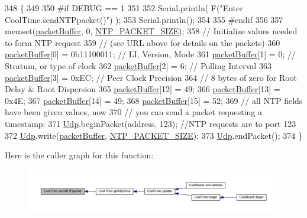 \begin{DoxyCode}
348 \{
349 
350 \textcolor{preprocessor}{#if DEBUG == 1 }
351 
352     Serial.println( F(\textcolor{stringliteral}{"Enter CoolTime.sendNTPpacket()"}) );
353     Serial.println();
354 
355 \textcolor{preprocessor}{#endif}
356 
357     memset(\hyperlink{class_cool_time_a27e6abc82a5c2f72161956967005bec7}{packetBuffer}, 0, \hyperlink{_cool_time_8h_a56a6ea64006651b4f42adf713e244f06}{NTP\_PACKET\_SIZE});
358     \textcolor{comment}{// Initialize values needed to form NTP request}
359     \textcolor{comment}{// (see URL above for details on the packets)}
360     \hyperlink{class_cool_time_a27e6abc82a5c2f72161956967005bec7}{packetBuffer}[0] = 0b11100011;   \textcolor{comment}{// LI, Version, Mode}
361     \hyperlink{class_cool_time_a27e6abc82a5c2f72161956967005bec7}{packetBuffer}[1] = 0;     \textcolor{comment}{// Stratum, or type of clock}
362     \hyperlink{class_cool_time_a27e6abc82a5c2f72161956967005bec7}{packetBuffer}[2] = 6;     \textcolor{comment}{// Polling Interval}
363     \hyperlink{class_cool_time_a27e6abc82a5c2f72161956967005bec7}{packetBuffer}[3] = 0xEC;  \textcolor{comment}{// Peer Clock Precision}
364     \textcolor{comment}{// 8 bytes of zero for Root Delay & Root Dispersion}
365     \hyperlink{class_cool_time_a27e6abc82a5c2f72161956967005bec7}{packetBuffer}[12]  = 49;
366     \hyperlink{class_cool_time_a27e6abc82a5c2f72161956967005bec7}{packetBuffer}[13]  = 0x4E;
367     \hyperlink{class_cool_time_a27e6abc82a5c2f72161956967005bec7}{packetBuffer}[14]  = 49;
368     \hyperlink{class_cool_time_a27e6abc82a5c2f72161956967005bec7}{packetBuffer}[15]  = 52;
369     \textcolor{comment}{// all NTP fields have been given values, now}
370     \textcolor{comment}{// you can send a packet requesting a timestamp:                 }
371     \hyperlink{class_cool_time_a4e23216a8121ca79d0fb019f30884b92}{Udp}.beginPacket(address, 123); \textcolor{comment}{//NTP requests are to port 123}
372     \hyperlink{class_cool_time_a4e23216a8121ca79d0fb019f30884b92}{Udp}.write(\hyperlink{class_cool_time_a27e6abc82a5c2f72161956967005bec7}{packetBuffer}, \hyperlink{_cool_time_8h_a56a6ea64006651b4f42adf713e244f06}{NTP\_PACKET\_SIZE});
373     \hyperlink{class_cool_time_a4e23216a8121ca79d0fb019f30884b92}{Udp}.endPacket(); 
374 \}
\end{DoxyCode}
Here is the caller graph for this function\+:\nopagebreak
\begin{figure}[H]
\begin{center}
\leavevmode
\includegraphics[width=350pt]{d6/d49/class_cool_time_a236a38d120dc53bc67456d763838c5a1_icgraph}
\end{center}
\end{figure}
\mbox{\label{class_cool_time_ab81ea7fdaace111aa01cc1ec84c6d297}} 

